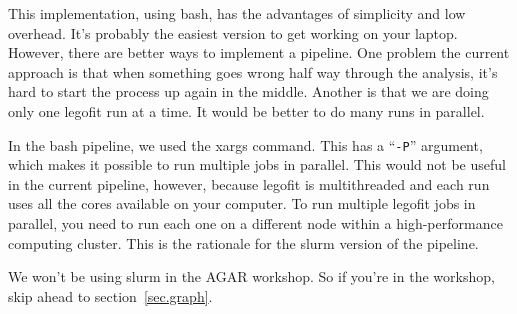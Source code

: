 \documentclass[11pt]{article}
\begin{document}
This implementation, using bash, has the advantages of simplicity and
low overhead. It's probably the easiest version to get working on your
laptop. However, there are better ways to implement a pipeline. One
problem the current approach is that when something goes wrong half
way through the analysis, it's hard to start the process up again in
the middle. Another is that we are doing only one legofit run at a
time. It would be better to do many runs in parallel.

In the bash pipeline, we used the xargs command. This has a
``\texttt{-P}'' argument, which makes it possible to run multiple jobs
in parallel. This would not be useful in the current pipeline,
however, because legofit is multithreaded and each run uses all the
cores available on your computer. To run multiple legofit jobs in
parallel, you need to run each one on a different node within a
high-performance computing cluster. This is the rationale for the
slurm version of the pipeline.

We won't be using slurm in the AGAR workshop. So if you're in the
workshop, skip ahead to section~\ref{sec.graph}.
\end{document}
